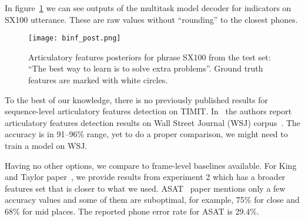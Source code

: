 \documentclass[a4paper]{article}
\begin{document}
In figure~\ref{fig:binf} we can see outputs of the multitask model decoder for indicators on SX100 utterance. These are raw values without ``rounding'' to the closest phones.
\begin{figure}[ht]
  \centering
  \texttt{[image: binf\_post.png]}
  \caption{Articulatory features posteriors for phrase SX100 from the test set: ``The best way to learn is to solve extra problems''. Ground truth features are marked with white circles. }
  \label{fig:binf}
\end{figure}

To the best of our knowledge, there is no previously published results for sequence-level articulatory features detection on TIMIT. In~\cite{Qu-2018} the authors report articulatory features detection results on Wall Street Journal (WSJ) corpus~\cite{WSJ}. The accuracy is in 91--96\% range, yet to do a proper comparison, we might need to train a model on WSJ.

Having no other options, we compare to frame-level baselines available. For King and Taylor paper~\cite{King-2000}, we provide results from experiment 2 which has a broader features set that is closer to what we used. ASAT~\cite{ASAT-2007} paper mentions only a few accuracy values and some of them are suboptimal, for example, 75\% for close and 68\% for mid places. The reported phone error rate for ASAT is 29.4\%.
\end{document}
